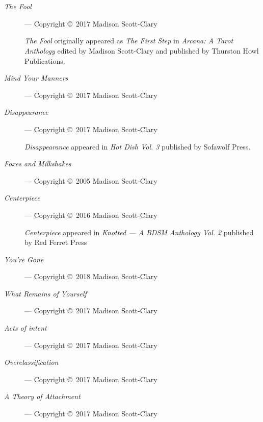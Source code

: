 \chapter*{}

\begin{description}
    \item[\emph{The Fool}]
    --- Copyright \copyright\ 2017 Madison Scott-Clary

    \emph{The Fool} originally appeared as \emph{The First Step} in \emph{Arcana: A Tarot Anthology} edited by Madison Scott-Clary and published by Thurston Howl Publications.
    \item[\emph{Mind Your Manners}]
    --- Copyright \copyright\ 2017 Madison Scott-Clary
    \item[\emph{Disappearance}]
    --- Copyright \copyright\ 2017 Madison Scott-Clary

    \emph{Disappearance} appeared in \emph{Hot Dish Vol. 3} published by Sofawolf Press.
    \item[\emph{Foxes and Milkshakes}]
    --- Copyright \copyright\ 2005 Madison Scott-Clary
    \item[\emph{Centerpiece}]
    --- Copyright \copyright\ 2016 Madison Scott-Clary

    \emph{Centerpiece} appeared in \emph{Knotted --- A BDSM Anthology Vol. 2} published by Red Ferret Press
    \item[\emph{You're Gone}] --- Copyright \copyright\ 2018 Madison Scott-Clary
    \item[\emph{What Remains of Yourself}]
    --- Copyright \copyright\ 2017 Madison Scott-Clary
    \item[\emph{Acts of intent}]
    --- Copyright \copyright\ 2017 Madison Scott-Clary
    \item[\emph{Overclassification}]
    --- Copyright \copyright\ 2017 Madison Scott-Clary
    \item[\emph{A Theory of Attachment}]
    --- Copyright \copyright\ 2017 Madison Scott-Clary
\end{description}

